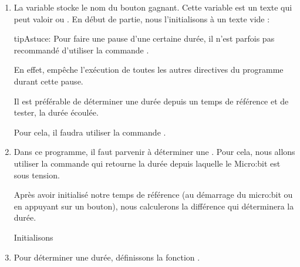 \documentclass[letterpaper,10pt,french]{sphinxmanual}
\begin{document}
\begin{enumerate}
\item {} 
La variable  stocke le nom du bouton gagnant.
Cette variable est un texte qui peut valoir  ou .
En début de partie, nous l’initialisons à un texte vide :

%
\begin{sphinxVerbatim}[commandchars=\\\{\}]
  
\end{sphinxVerbatim}

\begin{sphinxadmonition}{tip}{Astuce:}
Pour faire une pause d’une certaine durée, il n’est parfois
pas recommandé d’utiliser la commande .

En effet,  empêche l’exécution de toutes
les autres directives du programme durant cette pause.

Il est préférable de déterminer une durée depuis un temps de
référence et de tester,  la
durée écoulée.

Pour cela, il faudra utiliser la commande .
\end{sphinxadmonition}

\item {} 
Dans ce programme, il faut parvenir à déterminer une .
Pour cela, nous allons utiliser la commande 
qui retourne la durée depuis laquelle le Micro:bit est sous
tension.

Après avoir initialisé notre temps de référence 
(au démarrage du micro:bit ou en appuyant sur un bouton),
nous calculerons la différence 
qui déterminera la durée.

Initialisons 

%
\begin{sphinxVerbatim}[commandchars=\\\{\}]
  
\end{sphinxVerbatim}

\item {} 
Pour déterminer une durée, définissons la fonction .


\end{enumerate}
\end{document}
